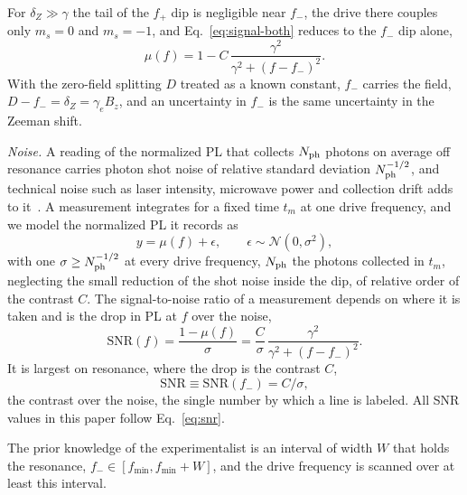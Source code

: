For $\delta_Z\gg\gamma$ the tail of the $f_+$ dip is negligible near $f_-$, the drive there couples only $m_s=0$ and
$m_s=-1$, and Eq.~\eqref{eq:signal-both} reduces to the $f_-$ dip alone,
\begin{equation}
  \mu(f)=1-C\,\frac{\gamma^2}{\gamma^2+(f-f_-)^2}.
  \label{eq:signal}
\end{equation}
With the zero-field splitting $D$ treated as a known constant, $f_-$ carries the field,
$D-f_-=\delta_Z=\gamma_e B_z$, and an uncertainty in $f_-$ is the same uncertainty in the Zeeman shift.

\emph{Noise.} A reading of the normalized PL that collects $N_{\rm ph}$ photons on average off resonance carries photon shot noise of relative standard deviation $N_{\rm ph}^{-1/2}$, and technical noise
such as laser intensity, microwave power and collection drift adds to it~\cite{hincks2018}. A measurement
integrates for a fixed time $t_m$ at one drive frequency, and we model the normalized PL it records as
\begin{equation}
  y=\mu(f)+\epsilon,\qquad \epsilon\sim\mathcal N(0,\sigma^2),
  \label{eq:noise}
\end{equation}
with one $\sigma\ge N_{\rm ph}^{-1/2}$ at every drive frequency, $N_{\rm ph}$ the photons collected in $t_m$,
neglecting the small reduction of the shot noise inside the dip, of relative order of the contrast $C$. The
signal-to-noise ratio of a measurement depends on where it is taken and is the drop in PL at $f$ over the noise,
\begin{equation}
  \mathrm{SNR}(f)=\frac{1-\mu(f)}{\sigma}=\frac{C}{\sigma}\,\frac{\gamma^2}{\gamma^2+(f-f_-)^2}.
  \label{eq:snr-local}
\end{equation}
It is largest on resonance, where the drop is the contrast $C$,
\begin{equation}
  \mathrm{SNR}\equiv\mathrm{SNR}(f_-)=C/\sigma ,
  \label{eq:snr}
\end{equation}
the contrast over the noise, the single number by which a line is labeled. All SNR values in this paper follow
Eq.~\eqref{eq:snr}.

The prior knowledge of the experimentalist is an interval of width $W$ that holds the resonance,
$f_-\in[f_{\min},f_{\min}+W]$, and the drive frequency is scanned over at least this interval.

